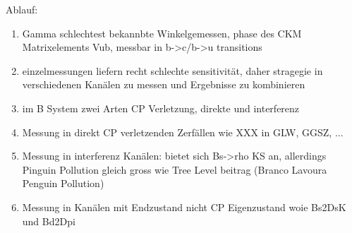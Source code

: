 Ablauf:
\begin{enumerate}
	\item Gamma schlechtest bekannbte Winkelgemessen, phase des CKM Matrixelements Vub, messbar in b->c/b->u transitions
	\item einzelmessungen liefern recht schlechte sensitivität, daher stragegie in verschiedenen Kanälen zu messen und Ergebnisse zu kombinieren
	\item im B System zwei Arten CP Verletzung, direkte und interferenz
	\item Messung in direkt CP verletzenden Zerfällen wie XXX in GLW, GGSZ, ...
	\item Messung in interferenz Kanälen: bietet sich Bs->rho KS an, allerdings Pinguin Pollution gleich gross wie Tree Level beitrag (Branco Lavoura Penguin Pollution)
	\item Messung in Kanälen mit Endzustand nicht CP Eigenzustand woie Bs2DsK und Bd2Dpi
\end{enumerate}


